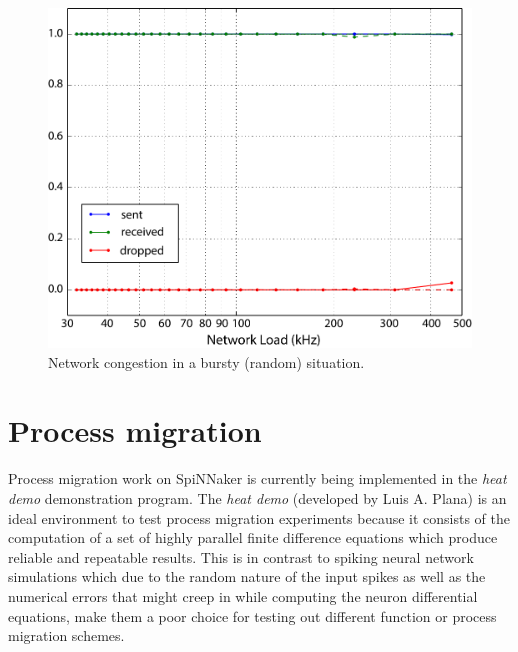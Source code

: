 \documentclass[a4paper, 11pt]{article}
\begin{document}
\begin{figure}[htbp]
	\centering
	\includegraphics[width=0.5\linewidth]{images/bursting_random2.pdf}
	\caption{Network congestion in a bursty (random) situation.}	
	\label{fig:bursting_random}
\end{figure}

\clearpage
\section{Process migration}
\label{sec:migration}

Process migration work on SpiNNaker is currently being implemented in the \emph{heat demo} demonstration program. The \emph{heat demo} (developed by Luis A. Plana) is an ideal environment to test process migration experiments because it consists of the computation of a set of highly parallel finite difference equations which produce reliable and repeatable results. This is in contrast to spiking neural network simulations which due to the random nature of the input spikes as well as the numerical errors that might creep in while computing the neuron differential equations, make them a poor choice for testing out different function or process migration schemes. 
\end{document}
